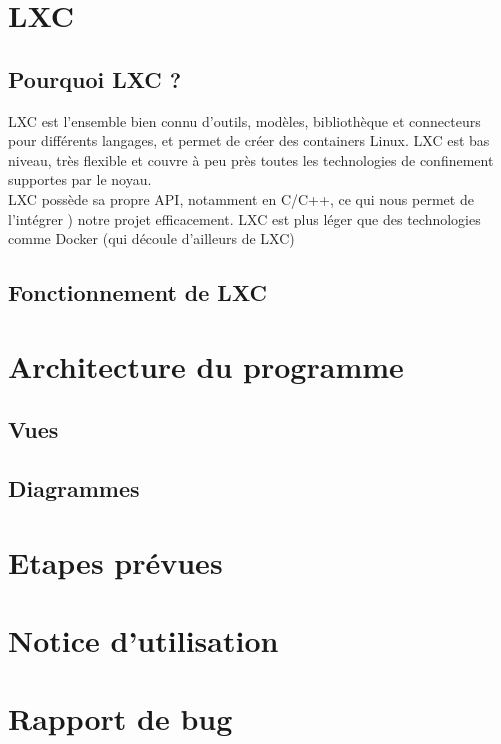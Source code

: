 \documentclass[a4paper]{article}
\begin{document}
\section{LXC}
\subsection{Pourquoi LXC ?}
LXC est l'ensemble bien connu d'outils, modèles, bibliothèque et connecteurs pour diff\'erents langages, et permet de cr\'eer des containers Linux. LXC est bas niveau, très flexible et couvre à peu près toutes les technologies de confinement supportes par le noyau.\\LXC possède sa propre API, notamment en C/C++, ce qui nous permet de l'int\'egrer ) notre projet efficacement. LXC est plus l\'eger que des technologies comme Docker (qui d\'ecoule d'ailleurs de LXC)

\subsection{Fonctionnement de LXC}


\section{Architecture du programme}
\subsection{Vues}

\subsection{Diagrammes}


\section{Etapes pr\'evues}



\section{Notice d'utilisation}


\section{Rapport de bug}

\end{document}
